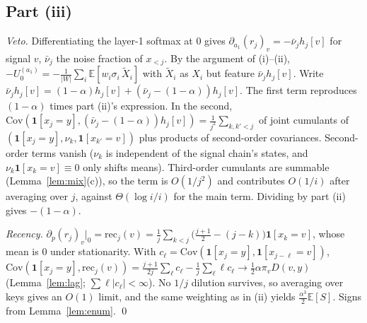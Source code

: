 \documentclass[11pt]{article}
\theoremstyle{definition}\newtheorem{assumption}{Assumption}\newtheorem{definition}{Definition}
\theoremstyle{remark}\newtheorem{remark}{Remark}
\newcommand{\1}{\mathbf{1}}\newcommand{\E}{\mathbb E}
\begin{document}
\subsection{Part (iii)}
\emph{Veto.} Differentiating the layer-1 softmax at $0$ gives $\partial_{a_1}(r_j)_v=-\bar\nu_jh_j[v]$ for signal $v$,
$\bar\nu_j$ the noise fraction of $x_{<j}$. By the argument of (i)--(ii),
$-U_0^{(a_1)}=-\frac1{|W|}\sum_i\E[w_i\sigma_i\,\tilde X_i]$ with $\tilde X_i$ as $X_i$ but feature $\bar\nu_jh_j[v]$. Write
$\bar\nu_jh_j[v]=(1-\alpha)h_j[v]+(\bar\nu_j-(1-\alpha))h_j[v]$. The first term reproduces $(1-\alpha)$ times part (ii)'s
expression. In the second, $\mathrm{Cov}(\1[x_j=y],(\bar\nu_j-(1-\alpha))h_j[v])=\frac1{j^2}\sum_{k,k'<j}$ of joint
cumulants of $(\1[x_j=y],\nu_k,\1[x_{k'}=v])$ plus products of second-order covariances. Second-order terms
vanish ($\nu_k$ is independent of the signal chain's states, and $\nu_k\1[x_k=v]\equiv0$ only shifts means).
Third-order cumulants are summable (Lemma~\ref{lem:mix}(c)), so the term is $O(1/j^2)$ and contributes
$O(1/i)$ after averaging over $j$, against $\Theta(\log i/i)$ for the main term. Dividing by part (ii) gives
$-(1-\alpha)$.

\emph{Recency.} $\partial_p(r_j)_v|_0=\mathrm{rec}_j(v)=\frac1j\sum_{k<j}\big(\tfrac{j+1}2-(j-k)\big)\1[x_k=v]$, whose mean is
$0$ under stationarity. With $c_\ell=\mathrm{Cov}(\1[x_j=y],\1[x_{j-\ell}=v])$,
$\mathrm{Cov}(\1[x_j=y],\mathrm{rec}_j(v))=\frac{j+1}{2j}\sum_\ell c_\ell-\frac1j\sum_\ell\ell c_\ell\to\frac12\alpha\pi_vD(v,y)$
(Lemma~\ref{lem:lag}; $\sum\ell|c_\ell|<\infty$). No $1/j$ dilution survives, so averaging over keys gives an
$O(1)$ limit, and the same weighting as in (ii) yields $\frac{\alpha^3}2\E[S]$. Signs from Lemma~\ref{lem:enum}. \qed
\end{document}
